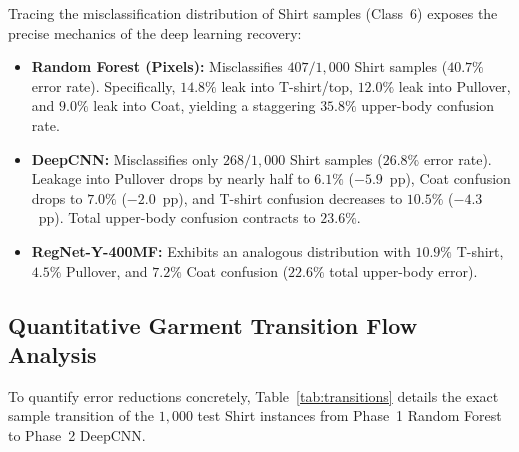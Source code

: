 \documentclass[conference]{IEEEtran}
\begin{document}
Tracing the misclassification distribution of Shirt samples (Class~6) exposes the precise mechanics of the deep learning recovery:
\begin{itemize}
    \item \textbf{Random Forest (Pixels):} Misclassifies $407/1{,}000$ Shirt samples ($40.7\%$ error rate). Specifically, $14.8\%$ leak into T-shirt/top, $12.0\%$ leak into Pullover, and $9.0\%$ leak into Coat, yielding a staggering $35.8\%$ upper-body confusion rate.
    \item \textbf{DeepCNN:} Misclassifies only $268/1{,}000$ Shirt samples ($26.8\%$ error rate). Leakage into Pullover drops by nearly half to $6.1\%$ ($-5.9$~pp), Coat confusion drops to $7.0\%$ ($-2.0$~pp), and T-shirt confusion decreases to $10.5\%$ ($-4.3$~pp). Total upper-body confusion contracts to $23.6\%$.
    \item \textbf{RegNet-Y-400MF:} Exhibits an analogous distribution with $10.9\%$ T-shirt, $4.5\%$ Pullover, and $7.2\%$ Coat confusion ($22.6\%$ total upper-body error).
\end{itemize}

\subsection{Quantitative Garment Transition Flow Analysis}
To quantify error reductions concretely, Table~\ref{tab:transitions} details the exact sample transition of the $1{,}000$ test Shirt instances from Phase~1 Random Forest to Phase~2 DeepCNN.

\begin{table}[t]
\centering
\caption{Quantitative Classification Transition of 1,000 Shirt Test Samples}
\label{tab:transitions}
\end{table}
\end{document}
